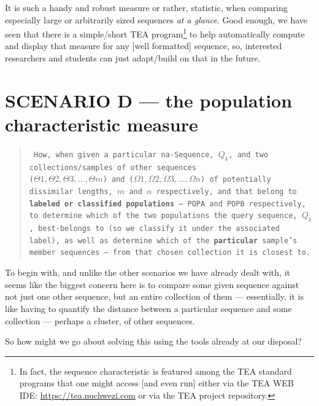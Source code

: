 \documentclass[a4paper, 18pt]{book} %
\begin{document}
It is such a handy and robust measure or rather, statistic, when comparing especially large or arbitrarily sized sequences \textit{at a glance}. Good enough, we have seen that there is a simple/short TEA program\footnote{In fact, the sequence characteristic is featured among the TEA standard programs that one might access [and even run] either via the TEA WEB IDE: \url{https://tea.nuchwezi.com} or via the TEA project repository\cite{cli_tttt}.} to help automatically compute and display that measure for any [well formatted] sequence, so, interested researchers and students can just adapt/build on that in the future.


\section{SCENARIO D --- the population characteristic measure}
\label{SECSCEND}

\begin{quote}
\small
\texttt{
How, when given a particular na-Sequence, $Q_k$, and two collections/samples of other sequences\\
 ($\Theta1, \Theta2, \Theta3,..., \Theta m$) and ($\Omega1, \Omega2, \Omega3,..., \Omega n$) of potentially dissimilar lengths, $m$ and $n$ respectively, and that belong to \textbf{labeled or classified populations} --- POPA and POPB respectively, to determine which of the two populations the query sequence, $Q_k$, best-belongs to (so we classify it under the associated label), as well as determine which of the \textbf{particular} sample's member sequences --- from that chosen collection it is closest to.}
\end{quote}


To begin with, and unlike the other scenarios we have already dealt with, it seems like the biggest concern here is to compare some given sequence against not just one other sequence, but an entire collection of them --- essentially, it is like having to quantify the distance between a particular sequence and some collection --- perhaps a cluster, of other sequences. 

So how might we go about solving this using the tools already at our disposal?
\end{document}
